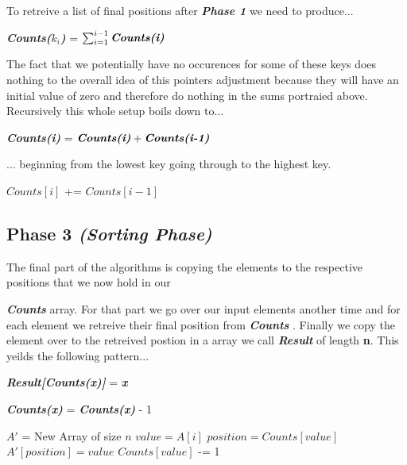 \documentclass{article}
\newcommand{\variable}[1]{
    \textit{\textbf{#1}}
}
\begin{document}
        To retreive a list of final positions after \textit{\textbf{Phase 1}} we need to produce...
        \begin{center}
            \variable{Counts($k_i$)}= $\sum_{i=1}^{i-1}\variable{Counts(i)}$
        \end{center}

        The fact that we potentially have no occurences for some of these keys does nothing to the overall idea
        of this pointers adjustment because they will have an initial value of zero and therefore do nothing in
        the sums portraied above. Recursively this whole setup boils down to...
        \begin{center}
            \variable{Counts(i)}= $\variable{Counts(i)} + \variable{Counts(i-1)}$
        \end{center}
        ... beginning from the lowest key going through to the highest key.
        \begin{algorithmic}
                \State[...]
                \State
                        \State$Counts[i]$ += $Counts[i - 1]$
                    \EndFor
                \State[...]
            \EndFunction
        \end{algorithmic}
        
        \subsection{Phase 3 \textit{(Sorting Phase)}}
        The final part of the algorithms is copying the elements to the respective positions that we now hold in our
        \variable{Counts} array. For that part we go over our input elements another time and for each element we retreive their final position from\variable{Counts}. Finally we copy the element over to the retreived postion
        in a array we call\variable{Result}of length \textbf{n}. This yeilds the following pattern...
        \begin{center}
            \variable{Result[Counts(x)]}=\variable{x}\goodbreak
            \variable{Counts(x)} =\variable{Counts(x)} - 1
        \end{center}
        \begin{algorithmic}
                \State[...]
                \State$A'$ = New Array of size $n$
                \State
                        \State$value = A[i]$
                        \State$position = Counts[value]$
                        \State$A'[position] = value$
                        \State$Counts[value]$ -= 1
                    \EndFor
            \EndFunction
        \end{algorithmic}
        \newpage
\end{document}
